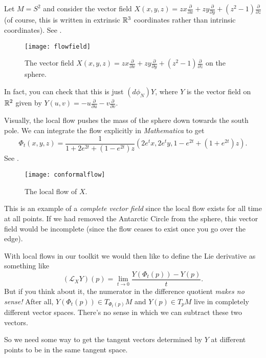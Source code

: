 \begin{example} 
	Let $M = S^2$ and consider the vector field $X(x,y,z) = zx \frac{\partial}{\partial x} + zy \frac{\partial}{\partial y} +\left(z^2-1\right) \frac{\partial}{\partial z}$ (of course, this is written in extrinsic $\mathbb{R}^3$ coordinates rather than intrinsic coordinates). See .
	
	\begin{figure}[htbp]
		\centering
			\texttt{[image: flowfield]}
		\caption{The vector field $X(x,y,z) = zx \frac{\partial}{\partial x} + zy \frac{\partial}{\partial y} +\left(z^2-1\right) \frac{\partial}{\partial z}$ on the sphere.}
		\label{fig:flowfield}
	\end{figure}
	
	In fact, you can check that this is just $(d\phi_N)Y$, where $Y$ is the vector field on $\mathbb{R}^2$ given by $Y(u,v) = -u \frac{\partial}{\partial u} - v \frac{\partial }{\partial v}$.
	
	Visually, the local flow pushes the mass of the sphere down towards the south pole. We can integrate the flow explicitly in \emph{Mathematica} to get
	\[
		\Phi_t(x,y,z) = \frac{1}{1+2e^{2t} + \left(1-e^{2t}\right)z}\left(2e^t x, 2e^t y, 1-e^{2t} + \left(1+e^{2t}\right)z\right).
	\]
	See .
	
	\begin{figure}[htbp]
		\centering
			\texttt{[image: conformalflow]}
		\caption{The local flow of $X$.}
		\label{fig:conformalflow}
	\end{figure}
	
	This is an example of a \emph{complete vector field} since the local flow exists for all time at all points. If we had removed the Antarctic Circle from the sphere, this vector field would be incomplete (since the flow ceases to exist once you go over the edge).
\end{example}

With local flows in our toolkit we would then like to define the Lie derivative as something like
\[
	(\mathcal{L}_XY)(p) = \lim_{t \to 0} \frac{Y(\Phi_t(p)) - Y(p)}{t}.
\]
But if you think about it, the numerator in the difference quotient \emph{makes no sense!} After all, $Y(\Phi_t(p)) \in T_{\Phi_t(p)}M$ and $Y(p) \in T_pM$ live in completely different vector spaces. There's no sense in which we can subtract these two vectors.

So we need some way to get the tangent vectors determined by $Y$ at different points to be in the same tangent space.

